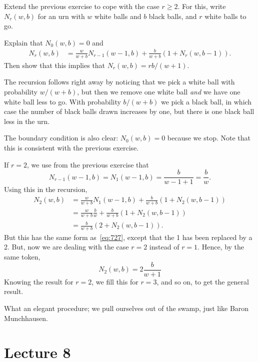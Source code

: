 \begin{exercise}
Extend the previous exercise to cope with the case $r\geq 2$.
For this, write $N_{r}(w,b)$ for an urn with $w$ white balls and $b$ black balls, and $r$ white balls to go.
\begin{hint}
Explain that $N_{0}(w,b) = 0$ and
\begin{align}
  N_r(w,b) &= \frac{w}{w+b} N_{r-1}(w-1, b) +  \frac{b}{w+b} (1+N_{r}(w, b-1)).
\end{align}
Then show that this implies that $N_{r}(w,b) = r b/ (w+1)$.
\end{hint}
\begin{solution}
The recursion follows right away by noticing that we pick a white ball with probability $w/(w+b)$, but then we remove one white ball \emph{and} we have one white ball less to go.
With probability $b/(w+b)$ we pick a black ball, in which case the number of black balls drawn increases by one, but there is one black ball less in the urn.

The boundary condition is also clear: $N_{0}(w,b)=0$ because we stop.
Note that this is consistent with the previous exercise.

If $r=2$, we use from the previous exercise that
\begin{equation*}
N_{r-1}(w-1, b) = N_{1}(w-1, b) = \frac{b }{w-1 + 1} = \frac{b }{w}.
\end{equation*}
Using this in the recursion,
\begin{align*}
  N_2(w,b)
&= \frac{w}{w+b} N_{1}(w-1, b) +  \frac{b}{w+b} (1+N_{2}(w, b-1)) \\
&= \frac{w}{w+b} \frac{b }{w} +  \frac{b}{w+b} (1+N_{2}(w, b-1)) \\
&=  \frac{b}{w+b} (2+N_{2}(w, b-1)).
\end{align*}
But this has the same form as~\cref{eq:727}, except that the 1 has been replaced by a 2. But, now we are dealing with the case $r=2$ instead of $r=1$. Hence, by the same token,
\begin{equation*}
  N_2(w,b) = 2 \frac{b}{w+1}
\end{equation*}
Knowing the result for $r=2$, we fill this for $r=3$, and so on, to get the general result.

What an elegant procedure;  we pull ourselves out of the swamp, just like Baron Munchhausen.
\end{solution}
\end{exercise}

\section{Lecture 8}



